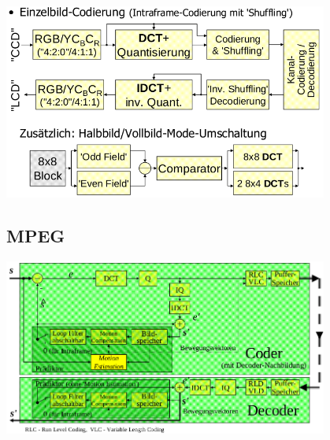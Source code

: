 \includegraphics[width=0.8\textwidth]{dv}

\subsection*{MPEG}

\includegraphics[width=0.8\textwidth]{mpeg}
